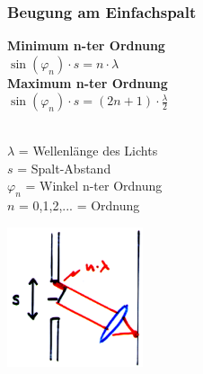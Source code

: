 \begin{minipage}{9cm}
	\subsubsection{Beugung am Einfachspalt}
	\begin{minipage}{4.5cm}
	\textbf{Minimum n-ter Ordnung}\\
		$\sin(\varphi_n) \cdot s = n \cdot \lambda $\\ 	
	\textbf{Maximum n-ter Ordnung}\\
		$\sin(\varphi_n) \cdot s = (2n + 1)\cdot \frac{\lambda}{2} $\\	
		\\
		\begin{minipage}{4.5cm}
			$\lambda$ = Wellenlänge des Lichts\\
			$s$ = Spalt-Abstand\\
			$\varphi_n$ = Winkel n-ter Ordnung\\
			$n$ = 0,1,2,... = Ordnung
		\end{minipage}
	\end{minipage}
	\begin{minipage}{4cm}
		\includegraphics[width = 4cm]{./bilder/beugung-einfachspalt}
	\end{minipage}
\end{minipage}



